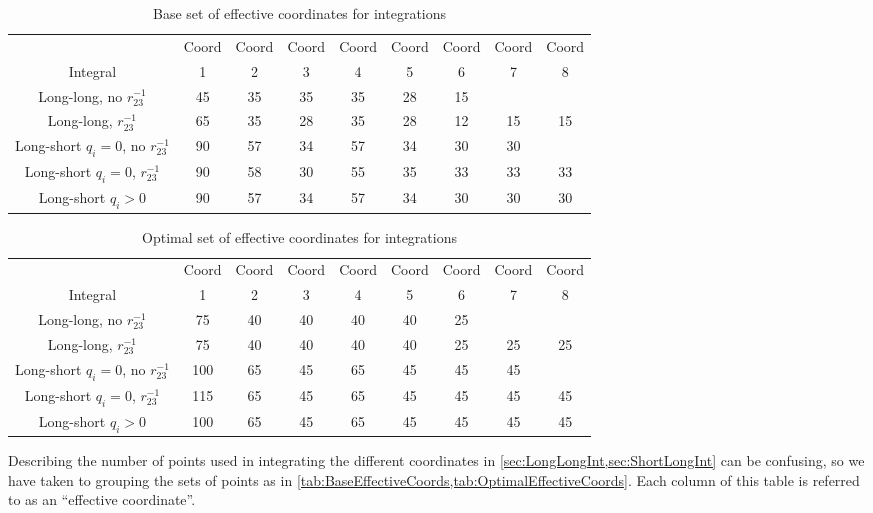 \documentclass[Dissertation.tex]{subfiles}
\begin{document}

\begin{table}
\centering
\footnotesize
\begin{tabular}{c c c c c c c c c}
\toprule
 & Coord & Coord & Coord & Coord & Coord & Coord & Coord & Coord\\
Integral & 1 & 2 & 3 & 4 & 5 & 6 & 7 & 8 \\
\midrule
 Long-long, no $r_{23}^{-1}$ & 45 & 35 & 35 & 35 & 28 & 15 & & \\
 Long-long, $r_{23}^{-1}$ & 65 & 35 & 28 & 35 & 28 & 12 & 15 & 15 \\
\midrule
 Long-short $q_i = 0$, no $r_{23}^{-1}$ & 90 & 57 & 34 & 57 & 34 & 30 & 30 & \\
 Long-short $q_i = 0$, $r_{23}^{-1}$ & 90 & 58 & 30 & 55 & 35 & 33 & 33 & 33 \\
 Long-short $q_i > 0$ & 90 & 57 & 34 & 57 & 34 & 30 & 30 & 30 \\
\bottomrule
\end{tabular}
\caption{Base set of effective coordinates for integrations}
\label{tab:BaseEffectiveCoords}
\end{table}

\begin{table}
\centering
\footnotesize
\begin{tabular}{c c c c c c c c c}
\toprule
 & Coord & Coord & Coord & Coord & Coord & Coord & Coord & Coord\\
Integral & 1 & 2 & 3 & 4 & 5 & 6 & 7 & 8 \\
\midrule
 Long-long, no $r_{23}^{-1}$			&  75 & 40 & 40 & 40 & 40 & 25 & & \\
 Long-long, $r_{23}^{-1}$				&  75 & 40 & 40 & 40 & 40 & 25 & 25 & 25 \\
\midrule
 Long-short $q_i = 0$, no $r_{23}^{-1}$	& 100 & 65 & 45 & 65 & 45 & 45 & 45 & \\
 Long-short $q_i = 0$, $r_{23}^{-1}$	& 115 & 65 & 45 & 65 & 45 & 45 & 45 & 45 \\
 Long-short $q_i > 0$					& 100 & 65 & 45 & 65 & 45 & 45 & 45 & 45 \\
\bottomrule
\end{tabular}
\caption{Optimal set of effective coordinates for integrations}
\label{tab:OptimalEffectiveCoords}
\end{table}

Describing the number of points used in integrating the different coordinates 
in \cref{sec:LongLongInt,sec:ShortLongInt} can be 
confusing, so we have taken to grouping the sets of points as in
\cref{tab:BaseEffectiveCoords,tab:OptimalEffectiveCoords}. Each column of 
this table is referred to as an ``effective coordinate''.
\end{document}

